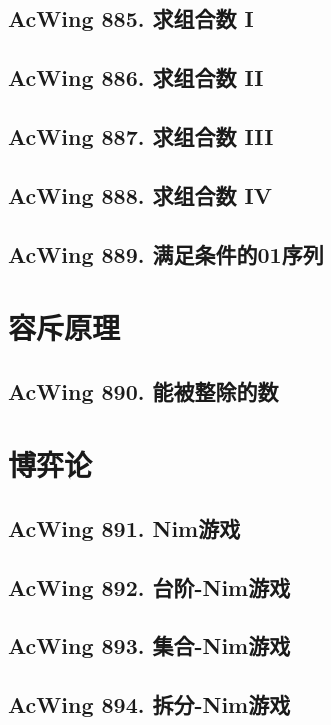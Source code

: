 \subsection{AcWing 885. 求组合数 I}

\subsection{AcWing 886. 求组合数 II}

\subsection{AcWing 887. 求组合数 III}

\subsection{AcWing 888. 求组合数 IV}

\subsection{AcWing 889. 满足条件的01序列}


\section{容斥原理}

\subsection{AcWing 890. 能被整除的数}


\section{博弈论}

\subsection{AcWing 891. Nim游戏}

\subsection{AcWing 892. 台阶-Nim游戏}

\subsection{AcWing 893. 集合-Nim游戏}

\subsection{AcWing 894. 拆分-Nim游戏}
